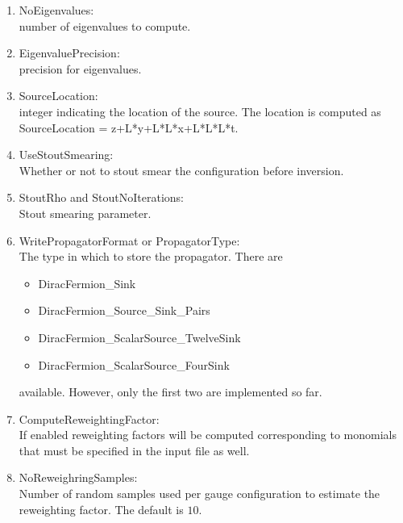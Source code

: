 \begin{enumerate}
\item {\ttfamily NoEigenvalues}:\\
  number of eigenvalues to compute.

\item {\ttfamily EigenvaluePrecision}:\\
  precision for eigenvalues.

\item {\ttfamily SourceLocation}:\\
  integer indicating the location of the source. The location is computed as
  {\ttfamily SourceLocation = z+L*y+L*L*x+L*L*L*t}.

\item {\ttfamily UseStoutSmearing}:\\
  Whether or not to stout smear the configuration before inversion.

\item {\ttfamily StoutRho} and {\ttfamily StoutNoIterations}:\\
  Stout smearing parameter.

\item {\ttfamily WritePropagatorFormat} or {\ttfamily PropagatorType}:\\
  The type in which to store the propagator. There are 
  \begin{itemize}
  \item {\ttfamily DiracFermion\_Sink}
  \item {\ttfamily DiracFermion\_Source\_Sink\_Pairs}
  \item {\ttfamily DiracFermion\_ScalarSource\_TwelveSink}
  \item {\ttfamily DiracFermion\_ScalarSource\_FourSink}
  \end{itemize}
  available. However, only the first two are implemented so far.

\item {\ttfamily ComputeReweightingFactor}:\\
  If enabled reweighting factors will be computed corresponding to
  monomials that must be specified in the input file as well.

\item {\ttfamily NoReweighringSamples}:\\
  Number of random samples used per gauge configuration to estimate
  the reweighting factor. The default is $10$.

\end{enumerate}


